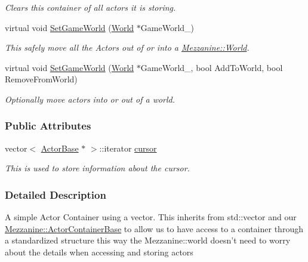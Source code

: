 \begin{DoxyCompactItemize}
\begin{DoxyCompactList}\small\item\em Clears this container of all actors it is storing. \item\end{DoxyCompactList}\item 
virtual void \hyperlink{classMezzanine_1_1ActorContainerVector_ab974d2704bfc3d74e3f008250ed893d8}{SetGameWorld} (\hyperlink{classMezzanine_1_1World}{World} $\ast$GameWorld\_\-)
\begin{DoxyCompactList}\small\item\em This safely move all the Actors out of or into a \hyperlink{classMezzanine_1_1World}{Mezzanine::World}. \item\end{DoxyCompactList}\item 
virtual void \hyperlink{classMezzanine_1_1ActorContainerVector_a7011795fcc3c3eb51b981aaebff23fac}{SetGameWorld} (\hyperlink{classMezzanine_1_1World}{World} $\ast$GameWorld\_\-, bool AddToWorld, bool RemoveFromWorld)
\begin{DoxyCompactList}\small\item\em Optionally move actors into or out of a world. \item\end{DoxyCompactList}\end{DoxyCompactItemize}
\subsubsection*{Public Attributes}
\begin{DoxyCompactItemize}
\item 
vector$<$ \hyperlink{classMezzanine_1_1ActorBase}{ActorBase} $\ast$ $>$::iterator \hyperlink{classMezzanine_1_1ActorContainerVector_ac359dee117cfe4829c656f7599ea9092}{cursor}
\begin{DoxyCompactList}\small\item\em This is used to store information about the cursor. \item\end{DoxyCompactList}\end{DoxyCompactItemize}


\subsubsection{Detailed Description}
A simple Actor Container using a vector. This inherits from std::vector and our \hyperlink{classMezzanine_1_1ActorContainerBase}{Mezzanine::ActorContainerBase} to allow us to have access to a container through a standardized structure this way the Mezzanine::world doesn't need to worry about the details when accessing and storing actors 

